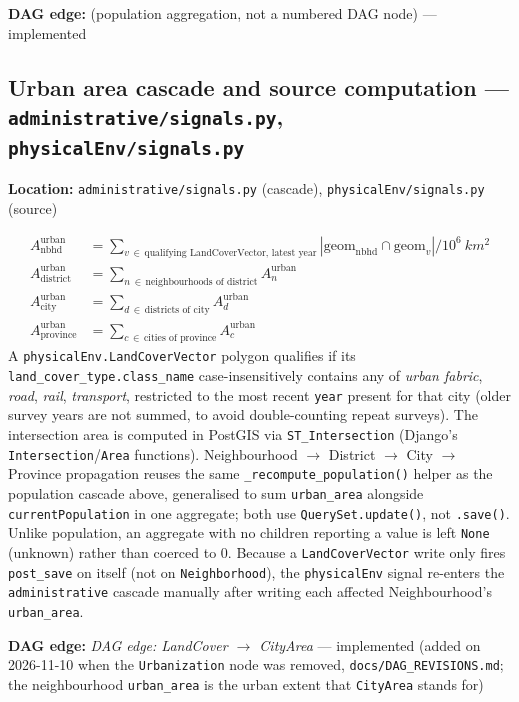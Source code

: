 \documentclass[11pt]{article}
\newcommand{\code}[1]{\texttt{#1}}
\newcommand{\dagedge}[1]{\textit{DAG edge: #1}}
\newcommand{\statusdone}{\textcolor{green!50!black}{implemented}}
\begin{document}
\textbf{DAG edge:} (population aggregation, not a numbered DAG node) --- \statusdone{}

\subsection{Urban area cascade and source computation --- \code{administrative/signals.py}, \code{physicalEnv/signals.py}}
\textbf{Location:} \code{administrative/signals.py} (cascade), \code{physicalEnv/signals.py} (source)

\begin{align}
  A^{\text{urban}}_{\text{nbhd}} &= \sum_{v \,\in\, \text{qualifying LandCoverVector, latest year}} \left| \mathrm{geom}_{\text{nbhd}} \cap \mathrm{geom}_v \right| / 10^6\ \si{km^2} \\
  A^{\text{urban}}_{\text{district}} &= \sum_{n \,\in\, \text{neighbourhoods of district}} A^{\text{urban}}_n \\
  A^{\text{urban}}_{\text{city}} &= \sum_{d \,\in\, \text{districts of city}} A^{\text{urban}}_d \\
  A^{\text{urban}}_{\text{province}} &= \sum_{c \,\in\, \text{cities of province}} A^{\text{urban}}_c
\end{align}
A \code{physicalEnv.LandCoverVector} polygon qualifies if its \code{land\_cover\_type.class\_name} case-insensitively contains any of \emph{urban fabric}, \emph{road}, \emph{rail}, \emph{transport}, restricted to the most recent \code{year} present for that city (older survey years are not summed, to avoid double-counting repeat surveys). The intersection area is computed in PostGIS via \code{ST\_Intersection} (Django's \code{Intersection}/\code{Area} functions). Neighbourhood $\rightarrow$ District $\rightarrow$ City $\rightarrow$ Province propagation reuses the same \code{\_recompute\_population()} helper as the population cascade above, generalised to sum \code{urban\_area} alongside \code{currentPopulation} in one aggregate; both use \code{QuerySet.update()}, not \code{.save()}. Unlike population, an aggregate with no children reporting a value is left \code{None} (unknown) rather than coerced to \num{0}. Because a \code{LandCoverVector} write only fires \code{post\_save} on itself (not on \code{Neighborhood}), the \code{physicalEnv} signal re-enters the \code{administrative} cascade manually after writing each affected Neighbourhood's \code{urban\_area}.

\textbf{DAG edge:} \dagedge{LandCover $\rightarrow$ CityArea} --- \statusdone{} (added on 2026-11-10 when the \code{Urbanization} node was removed, \code{docs/DAG\_REVISIONS.md}; the neighbourhood \code{urban\_area} is the urban extent that \code{CityArea} stands for)
\end{document}
